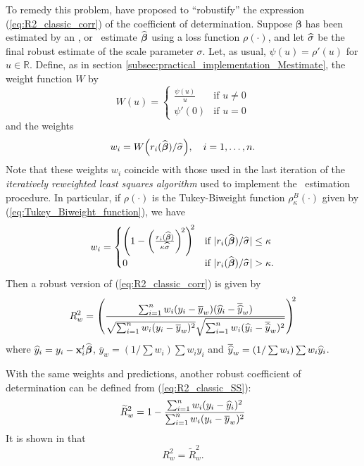 To remedy this problem, \cite{Renaud:VictoriaFeser:2010} have proposed to
“robustify” the expression (\ref{eq:R2_classic_corr}) of the coefficient of
determination. Suppose $\boldsymbol\beta$ has been estimated by an ,
 or ~estimate $\widehat{\boldsymbol\beta}$ using a loss function
$\rho(\cdot)$, and let $\widehat{\sigma}$ be the final robust estimate of the
scale parameter $\sigma$. Let, as usual, $\psi(u) = \rho'(u)$ for
$u\in\mathbb{R}$. Define, as in section
\ref{subsec:practical_implementation_Mestimate}, the weight function $W$ by
\[
    W(u) = 
    \begin{cases}
        \frac{\psi(u)}{u} & \text{if $u \neq 0$} \\
        \psi'(0)          & \text{if $u = 0$}
    \end{cases}
\]
and the weights
\[
    w_i = W \left(r_i(\sthat{\boldsymbol\beta})/\sthat{\sigma}\right),
    \quad i = 1, \dots, n.
\]
Note that these weights $w_i$ coincide with those used in the last iteration
of the \emph{iteratively reweighted least squares algorithm} used to implement
the ~estimation procedure. In particular, if $\rho(\cdot)$ is the
Tukey-Biweight function $\rho_{\kappa}^{B}(\cdot)$ given by
(\ref{eq:Tukey_Biweight_function}), we have
\[
    w_i =
    \begin{cases}
        \left(1 - \left(\frac{r_i(\sthat{\boldsymbol\beta})}{\kappa\sthat{\sigma}}\right)^{\!2}\right)^{\!\!2} 
        & \text{if $|r_i(\sthat{\boldsymbol\beta})/\sthat{\sigma}| \leq \kappa$}\\
        0 
        & \text{if $|r_i(\sthat{\boldsymbol\beta})/\sthat{\sigma}| > \kappa$}.
    \end{cases}
\]
Then a robust version of (\ref{eq:R2_classic_corr}) is given by
%
\begin{equation}
    \label{eq:R2_w}
    R_w^2 = \left(\frac{\sum_{i=1}^{n} w_i(y_i-\overline{y}_w) (\sthat{y}_i-\overline{\sthat{y}}_w)}
    {\sqrt{\sum_{i=1}^{n} w_i(y_i-\overline{y}_w)^2}
     \sqrt{\sum_{i=1}^{n} w_i(\sthat{y}_i-\overline{\sthat{y}}_w)^2}}\right)^{\!\!2}
\end{equation}
%
where $\widehat{y}_i = y_i - \mathbf x_i^t\widehat{\boldsymbol\beta}$,
$\overline{y}_w = (1/\sum w_i)\sum w_i y_i$ and $\overline{\widehat{y}}_w =
(1/\sum w_i)\sum w_i\widehat{y}_i$.

With the same weights and predictions, another robust coefficient of
determination can be defined from (\ref{eq:R2_classic_SS}):
%
\begin{equation}
    \label{eq:Rtilde2_w}
    \widetilde{R}_w^2 = 1 - \frac{\sum_{i=1}^{n} w_i(y_i - \widehat{y}_i)^2}
    {\sum_{i=1}^{n} w_i(y_i - \overline{y}_w)^2}
\end{equation}
%
It is shown in \citet{Renaud:VictoriaFeser:2010} that
\[
    R_w^2 = \widetilde{R}_w^2.
\]


